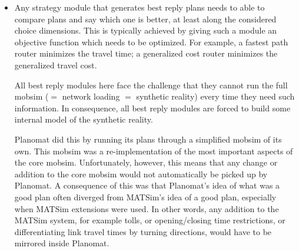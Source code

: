 \begin{itemize}

\item Any strategy module that generates best reply plans needs to able to compare plans and say which one is better, at least along the considered choice dimensions.  This is typically achieved by giving such a module an objective function which needs to be optimized.  For example, a fastest path router minimizes the travel time; a generalized cost router minimizes the generalized travel cost.

All best reply modules here face the challenge that they cannot run the full mobsim ($=$ network loading $=$ synthetic reality) every time they need such information.  In consequence, all best reply modules are forced to build some internal model of the synthetic reality.  

Planomat did this by running its plans through a simplified mobsim of its own.  This mobsim was a re-implementation of the most important aspects of the core mobsim.
%
%
Unfortunately, however, this means that any change or addition to the core mobsim would not automatically be picked up by Planomat.
%
A consequence of this was that Planomat's idea of what was a good plan often diverged from MATSim's idea of a good plan, especially when MATSim extensions were used.
%
In other words, any addition to the MATSim system, for example tolls, or opening/closing time restrictions, or differentiating link travel times by turning directions, would have to be mirrored inside Planomat.
%


\end{itemize}
